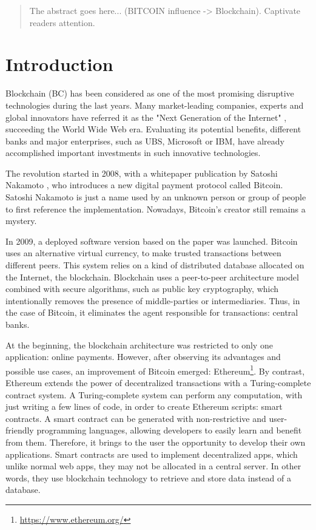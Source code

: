 \begin{abstract}
 The abstract goes here... (BITCOIN influence -> Blockchain). Captivate readers attention.
\end{abstract}




\chapter{Introduction}

Blockchain (BC) has been considered as one of the most promising disruptive technologies during the last years. Many market-leading companies, experts and global innovators have referred it as the "Next Generation of the Internet" \cite{JenClarck2017}, succeeding the World Wide Web era. Evaluating its potential benefits, different banks and major enterprises, such as UBS, Microsoft or IBM, have already accomplished important investments in such innovative technologies.

The revolution started in 2008, with a whitepaper publication by Satoshi Nakamoto \cite{nakamoto2008bitcoin}, who introduces a new digital payment protocol called Bitcoin. Satoshi Nakamoto is just a name used by an unknown person or group of people to first reference the implementation. Nowadays, Bitcoin's creator still remains a mystery.

In 2009, a deployed software version based on the paper was launched. Bitcoin uses an alternative virtual currency, to make trusted transactions between different peers. This system relies on a kind of distributed database allocated on the Internet, the blockchain. Blockchain uses a peer-to-peer architecture model combined with secure algorithms, such as public key cryptography, which intentionally removes the presence of middle-parties or intermediaries. Thus, in the case of Bitcoin, it eliminates the agent responsible for transactions: central banks.

At the beginning, the blockchain architecture was restricted to only one application: online payments. However, after observing its advantages and possible use cases, an improvement of Bitcoin emerged: Ethereum\footnote{\url{https://www.ethereum.org/}}. By contrast, Ethereum extends the power of decentralized transactions with a Turing-complete contract system. A Turing-complete system can perform any computation, with just writing a few lines of code, in order to create Ethereum scripts: smart contracts. A smart contract can be generated with non-restrictive and user-friendly programming languages, allowing developers to easily learn and benefit from them. Therefore, it brings to the user the opportunity to develop their own applications. Smart contracts are used to implement decentralized apps, which unlike normal web apps, they may not be allocated in a central server. In other words, they use blockchain technology to retrieve and store data instead of a database.


